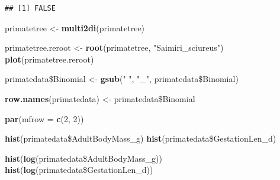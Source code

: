 \documentclass[]{article}
\newenvironment{Shaded}{\begin{snugshade}}{\end{snugshade}}
\newcommand{\KeywordTok}[1]{\textcolor[rgb]{0.13,0.29,0.53}{\textbf{{#1}}}}
\newcommand{\DataTypeTok}[1]{\textcolor[rgb]{0.13,0.29,0.53}{{#1}}}
\newcommand{\DecValTok}[1]{\textcolor[rgb]{0.00,0.00,0.81}{{#1}}}
\newcommand{\StringTok}[1]{\textcolor[rgb]{0.31,0.60,0.02}{{#1}}}
\newcommand{\NormalTok}[1]{{#1}}
\begin{document}
\begin{verbatim}
## [1] FALSE
\end{verbatim}

\begin{Shaded}
\begin{Highlighting}[]
\NormalTok{primatetree <-}\StringTok{ }\KeywordTok{multi2di}\NormalTok{(primatetree)}
\end{Highlighting}
\end{Shaded}

\begin{Shaded}
\begin{Highlighting}[]
\NormalTok{primatetree.reroot <-}\StringTok{ }\KeywordTok{root}\NormalTok{(primatetree, }\StringTok{"Saimiri_sciureus"}\NormalTok{)}
\KeywordTok{plot}\NormalTok{(primatetree.reroot)}
\end{Highlighting}
\end{Shaded}

\begin{Shaded}
\begin{Highlighting}[]
\NormalTok{primatedata\$Binomial <-}\StringTok{ }\KeywordTok{gsub}\NormalTok{(}\StringTok{" "}\NormalTok{, }\StringTok{"_"}\NormalTok{, primatedata\$Binomial)}
\end{Highlighting}
\end{Shaded}

\begin{Shaded}
\begin{Highlighting}[]
\KeywordTok{row.names}\NormalTok{(primatedata) <-}\StringTok{ }\NormalTok{primatedata\$Binomial}
\end{Highlighting}
\end{Shaded}

\begin{Shaded}
\begin{Highlighting}[]
\KeywordTok{par}\NormalTok{(}\DataTypeTok{mfrow =} \KeywordTok{c}\NormalTok{(}\DecValTok{2}\NormalTok{, }\DecValTok{2}\NormalTok{))}
\end{Highlighting}
\end{Shaded}

\begin{Shaded}
\begin{Highlighting}[]
\KeywordTok{hist}\NormalTok{(primatedata\$AdultBodyMass_g)}
\KeywordTok{hist}\NormalTok{(primatedata\$GestationLen_d)}
\end{Highlighting}
\end{Shaded}

\begin{Shaded}
\begin{Highlighting}[]
\KeywordTok{hist}\NormalTok{(}\KeywordTok{log}\NormalTok{(primatedata\$AdultBodyMass_g))}
\KeywordTok{hist}\NormalTok{(}\KeywordTok{log}\NormalTok{(primatedata\$GestationLen_d))}
\end{Highlighting}
\end{Shaded}
\end{document}
